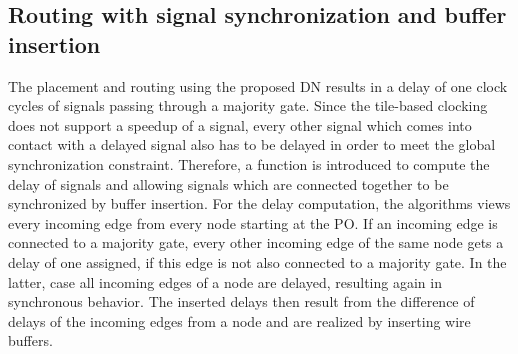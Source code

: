 \subsection{Routing with signal synchronization and buffer insertion}
The placement and routing using the proposed DN results in a delay of one clock cycles of signals passing through a majority gate. Since the tile-based clocking does not support a speedup of a signal, every other signal which comes into contact with a delayed signal also has to be delayed in order to meet the global synchronization constraint. Therefore, a function is introduced to compute the delay of signals and allowing signals which are connected together to be synchronized by buffer insertion. For the delay computation, the algorithms views every incoming edge from every node starting at the PO. If an incoming edge is connected to a majority gate, every other incoming edge of the same node gets a delay of one assigned, if this edge is not also connected to a majority gate. In the latter, case all incoming edges of a node are delayed, resulting again in synchronous behavior. The inserted delays then result from the difference of delays of the incoming edges from a node and are realized by inserting wire buffers.

